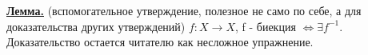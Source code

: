 \documentclass{article}
\begin{document}
\begin{obeylines}
	\bigskip
	\underline{\textbf{Лемма.}} (вспомогательное утверждение, полезное не само по себе, а для доказательства других утверждений) $f:  X \rightarrow X$, f - биекция  $\iff  \exists f^{-1}.$
	Доказательство остается читателю как несложное упражнение.
	\end{obeylines}
\end{document}
